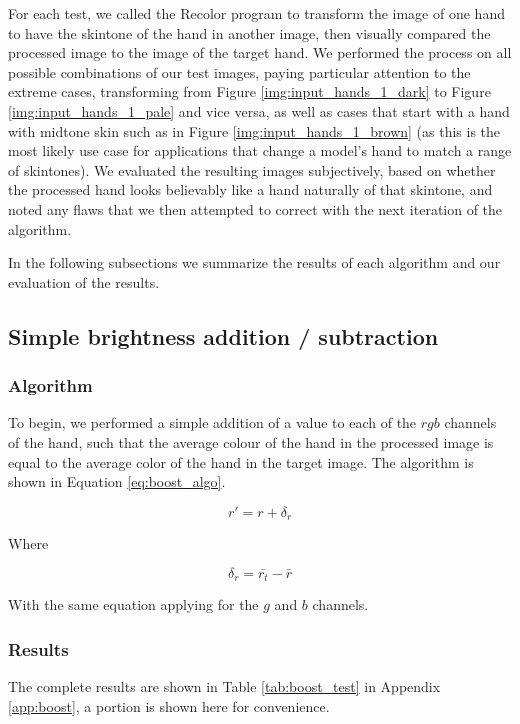 \documentclass[12pt, a4paper]{article}
\newcommand*\mean[1]{\bar{#1}}
\begin{document}
 For each test, we called the Recolor program to transform the image of one hand to have the skintone of the hand in another image, then visually compared the processed image to the image of the target hand. We performed the process on all possible combinations of our test images, paying particular attention to the extreme cases, transforming from Figure \ref{img:input_hands_1_dark} to Figure \ref{img:input_hands_1_pale} and vice versa, as well as cases that start with a hand with midtone skin such as in Figure \ref{img:input_hands_1_brown} (as this is the most likely use case for applications that change a model's hand to match a range of skintones). We evaluated the resulting images subjectively, based on whether the processed hand looks believably like a hand naturally of that skintone, and noted any flaws that we then attempted to correct with the next iteration of the algorithm.

In the following subsections we summarize the results of each algorithm and our evaluation of the results.

\subsection{Simple brightness addition / subtraction}
\subsubsection*{Algorithm}
To begin, we performed a simple addition of a value to each of the $rgb$ channels of the hand, such that the average colour of the hand in the processed image is equal to the average color of the hand in the target image. The algorithm is shown in Equation \ref{eq:boost_algo}.

\begin{equation} \label{eq:boost_algo}
r' = r + \delta_r
\end{equation}

Where 

\begin{equation*}
\delta_r = \mean{r_t} - \mean{r}
\end{equation*}

With the same equation applying for the $g$ and $b$ channels.

\subsubsection*{Results}
The complete results are shown in Table \ref{tab:boost_test} in Appendix \ref{app:boost}, a portion is shown here for convenience.
\end{document}
